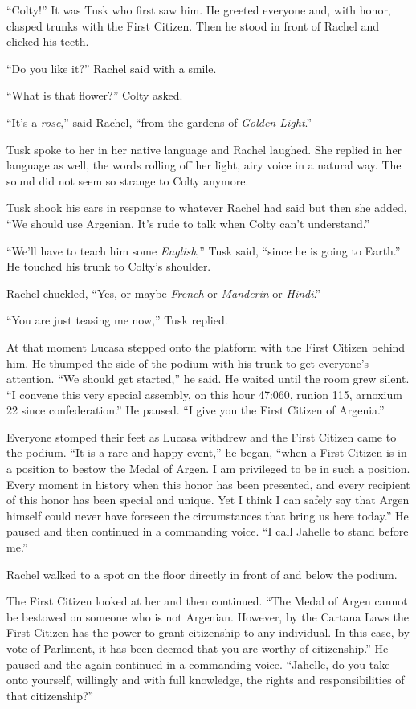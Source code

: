 ``Colty!'' It was Tusk who first saw him. He greeted everyone and, with honor, clasped trunks
with the First Citizen. Then he stood in front of Rachel and clicked his teeth.

``Do you like it?'' Rachel said with a smile.

``What is that flower?'' Colty asked.

``It's a \textit{rose},'' said Rachel, ``from the gardens of \textit{Golden Light}.''

Tusk spoke to her in her native language and Rachel laughed. She replied in her language as
well, the words rolling off her light, airy voice in a natural way. The sound did not seem so
strange to Colty anymore.

Tusk shook his ears in response to whatever Rachel had said but then she added, ``We should use
Argenian. It's rude to talk when Colty can't understand.''

``We'll have to teach him some \textit{English},'' Tusk said, ``since he is going to Earth.'' He
touched his trunk to Colty's shoulder.

Rachel chuckled, ``Yes, or maybe \textit{French} or \textit{Manderin} or \textit{Hindi}.''

``You are just teasing me now,'' Tusk replied.

At that moment Lucasa stepped onto the platform with the First Citizen behind him. He thumped
the side of the podium with his trunk to get everyone's attention. ``We should get started,'' he
said. He waited until the room grew silent. ``I convene this very special assembly, on this hour
47:060, runion 115, arnoxium 22 since confederation.'' He paused. ``I give you the First Citizen
of Argenia.''

Everyone stomped their feet as Lucasa withdrew and the First Citizen came to the podium. ``It is
a rare and happy event,'' he began, ``when a First Citizen is in a position to bestow the Medal
of Argen. I am privileged to be in such a position. Every moment in history when this honor has
been presented, and every recipient of this honor has been special and unique. Yet I think I can
safely say that Argen himself could never have foreseen the circumstances that bring us here
today.'' He paused and then continued in a commanding voice. ``I call Jahelle to stand before
me.''

Rachel walked to a spot on the floor directly in front of and below the podium.

The First Citizen looked at her and then continued. ``The Medal of Argen cannot be bestowed on
someone who is not Argenian. However, by the Cartana Laws the First Citizen has the power to
grant citizenship to any individual. In this case, by vote of Parliment, it has been deemed that
you are worthy of citizenship.'' He paused and the again continued in a commanding voice.
``Jahelle, do you take onto yourself, willingly and with full knowledge, the rights and
responsibilities of that citizenship?''

